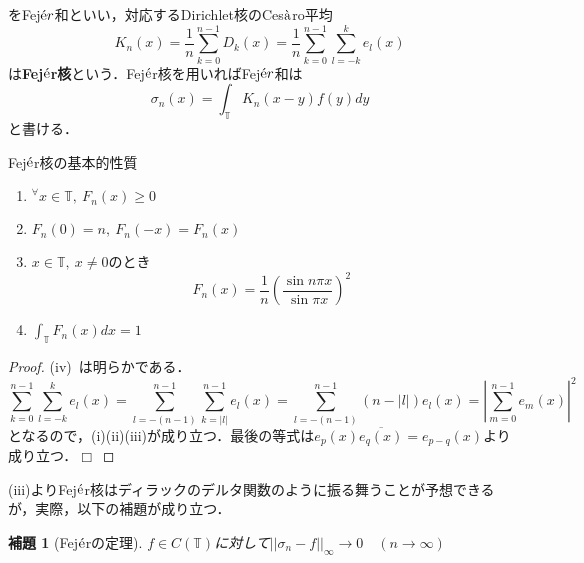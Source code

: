 \documentclass[a4paper,11pt]{jsarticle}
\newtheorem{lemma}[definition]{補題}
\newtheorem{proof}{証明}
\def\qed{\hfill $\Box$}
\begin{document}
をFej${\rm \acute{e}}r$和といい，対応するDirichlet核のCes${\rm \grave{a}}$ro平均
\begin{equation*}
K_n(x)=\frac{1}{n}\sum_{k=0}^{n-1}D_k(x)=\frac{1}{n}\sum_{k=0}^{n-1}\sum_{l=-k}^ke_l(x)
\end{equation*}
は{\bf Fej${\rm \acute{e}}$r核}という．Fej${\rm \acute{e}}$r核を用いればFej${\rm \acute{e}}r$和は
\begin{equation*}
\sigma_n(x)=\int_\mathbb{T}K_n(x-y)f(y)dy
\end{equation*}
と書ける．
\begin{itembox}[l]{Fej${\rm \acute{e}}$r核の基本的性質}
\begin{enumerate}
\renewcommand{\labelenumi}{(\roman{enumi})}
\item $^\forall x\in\mathbb{T},{\ }F_n(x)\geq 0$
\item $F_n(0)=n,{\ }F_n(-x)=F_n(x)$
\item $x\in\mathbb{T},{\ }x\neq 0$のとき
\begin{equation*}
F_n(x)=\frac{1}{n}\left(\frac{\sin{n\pi x}}{\sin{\pi x}}\right)^2
\end{equation*}
\item $\int_\mathbb{T}F_n(x)dx=1$
\end{enumerate}
\end{itembox}
\vspace{-0.7zh}%
\vspace{-0.7zh}%
\begin{proof}
(iv){\ }は明らかである．
\begin{equation*}
\sum_{k=0}^{n-1}\sum_{l=-k}^ke_l(x)=\sum_{l=-(n-1)}^{n-1}\sum_{k=|l|}^{n-1}e_l(x)=\sum_{l=-(n-1)}^{n-1}(n-|l|)e_l(x)=\left|\sum_{m=0}^{n-1}e_m(x)\right|^2
\end{equation*}
となるので，(i)(ii)(iii)が成り立つ．最後の等式は$e_p(x)\overline{e_q(x)}=e_{p-q}(x)$より成り立つ．\qed
\end{proof}
(iii)よりFej${\rm \acute{e}}$r核はディラックのデルタ関数のように振る舞うことが予想できるが，実際，以下の補題が成り立つ．
\setcounter{definition}{26}
\begin{lemma}[Fej${\rm \acute{e}}$rの定理]
$f\in C(\mathbb{T})$に対して$||\sigma_n-f||_\infty\to 0\quad (n\to\infty )$
\end{lemma}
\end{document}
